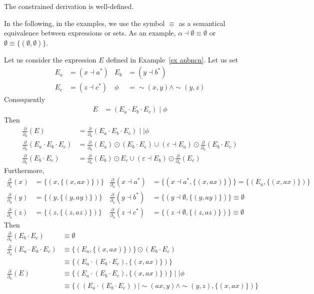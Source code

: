 \documentclass[a4paper]{llncs}
\begin{document}
  \begin{corollary}
    The constrained derivation is well-defined.
  \end{corollary} 
  In the following, in the examples, we use the symbol $\equiv$ as a semantical equivalence between expressions or sets. As an example, $\alpha\dashv \emptyset \equiv \emptyset$ or $\emptyset\equiv \{(\emptyset,\emptyset)\}$.
  \begin{example}\label{ex deriv anbncn}
    Let us consider the expression $E$ defined in Example~\ref{ex anbncn}.
    Let us set 
    \begin{align*}
      E_a &= (x\dashv a^*) &
      E_b &= (y\dashv b^*)\\
      E_c &= (z\dashv c^*) &
      \phi&= \sim(x,y)\wedge \sim (y,z)
    \end{align*}
    Consequently
    \begin{align*}
      E&= (E_a\cdot E_b \cdot E_c)\mid \phi
    \end{align*}
    Then
    \begin{align*}      
        \frac{\partial}{\partial_a}(E) &= \frac{\partial}{\partial_a}(E_a\cdot E_b\cdot E_c) \mid\mid \phi\\
        \frac{\partial}{\partial_a}(E_a\cdot E_b\cdot E_c)&=
          \frac{\partial}{\partial_a}(E_a)\odot (E_b \cdot E_c)
          \cup
          (\varepsilon\dashv E_a)\odot \frac{\partial}{\partial_a}(E_b \cdot E_c)\\
        \frac{\partial}{\partial_a}(E_b \cdot E_c) &=        
          \frac{\partial}{\partial_a}(E_b)\odot E_c
          \cup
          (\varepsilon\dashv E_b)\odot \frac{\partial}{\partial_a}(E_c)
    \end{align*}
    Furthermore,
    \begin{align*}
        \frac{\partial}{\partial_a}(x) &=\{(x,\{(x,ax)\})\} &
        \frac{\partial}{\partial_a}(x\dashv a^*) &=\{(x\dashv a^*,\{(x,ax)\})\}=\{(E_a,\{(x,ax)\})\}\\
        \frac{\partial}{\partial_a}(y) &=\{(y,\{(y,ay)\})\} &
        \frac{\partial}{\partial_a}(y\dashv b^*) &=\{(y\dashv \emptyset,\{(y,ay)\})\}\equiv \emptyset\\
        \frac{\partial}{\partial_a}(z) &=\{(z,\{(z,az)\})\} &
        \frac{\partial}{\partial_a}(z\dashv c^*) &=\{(z\dashv \emptyset,\{(z,az)\})\}\equiv \emptyset
    \end{align*}
    Then
    \begin{align*}
      \frac{\partial}{\partial_a}(E_b \cdot E_c) &\equiv \emptyset\\
      \frac{\partial}{\partial_a}(E_a\cdot E_b\cdot E_c)&\equiv \{(E_a,\{(x,ax)\})\} \odot (E_b \cdot E_c)\\
      &\equiv \{(E_a\cdot (E_b \cdot E_c),\{(x,ax)\})\}\\     
        \frac{\partial}{\partial_a}(E) &\equiv \{(E_a\cdot (E_b \cdot E_c),\{(x,ax)\})\} \mid\mid \phi\\
        &\equiv \{((E_a\cdot (E_b \cdot E_c))\mid \sim(ax,y)\wedge \sim (y,z),\{(x,ax)\})\}
    \end{align*}
  \end{example}
  
\end{document}
